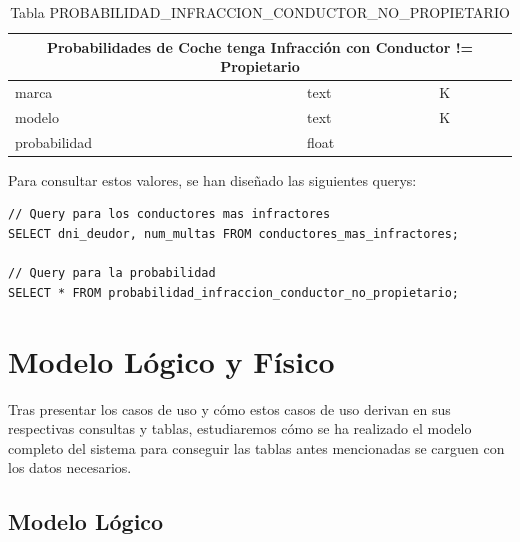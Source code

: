 \documentclass[]{article}
\begin{document}
\begin{itemize}
     \begin{table}[H]
        \centering
        \begin{tabular}{lll} 
            \toprule
            \multicolumn{3}{c}{\large\textbf{Probabilidades de Coche tenga Infracción con Conductor != Propietario}} \\ 
            \midrule
            marca      & text & K\\
            modelo     & text & K\\
            probabilidad   & float & \\
            \bottomrule
        \end{tabular}
        \caption {Tabla PROBABILIDAD\_INFRACCION\_CONDUCTOR\_NO\_PROPIETARIO}
     \end{table}

    Para consultar estos valores, se han diseñado las siguientes querys:

    \begin{lstlisting}[language=cql, caption=Querys para el caso de uso 3]
// Query para los conductores mas infractores
SELECT dni_deudor, num_multas FROM conductores_mas_infractores;

// Query para la probabilidad
SELECT * FROM probabilidad_infraccion_conductor_no_propietario;

    \end{lstlisting}
\end{itemize}

\section{Modelo Lógico y Físico}
\label{sec:modelo_logico_fisico}
Tras presentar los casos de uso y cómo estos casos de uso derivan en sus respectivas consultas y tablas, estudiaremos cómo se ha realizado el modelo completo del sistema para conseguir las tablas antes mencionadas se carguen con los datos necesarios.

\subsection{Modelo Lógico}
\end{document}
